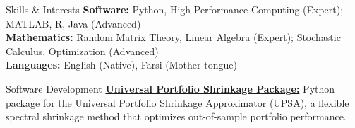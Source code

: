 \documentclass{resume}
\begin{document}
\begin{rSection}{Skills \& Interests}
{\bf Software:} Python, High-Performance Computing (Expert); MATLAB, R, Java (Advanced) \\
{\bf Mathematics:} Random Matrix Theory, Linear Algebra (Expert); Stochastic Calculus, Optimization (Advanced) \\
{\bf Languages:} English (Native), Farsi (Mother tongue)
\end{rSection}

\begin{rSection}{Software Development}
\href{https://github.com/pourmohammadimohammad/Universal_Portfolio_Shrinkage}{{\bf Universal Portfolio Shrinkage Package:}}
Python package for the Universal Portfolio Shrinkage Approximator (UPSA), a flexible spectral shrinkage method that optimizes out-of-sample portfolio performance. 
\end{rSection}
\end{document}

